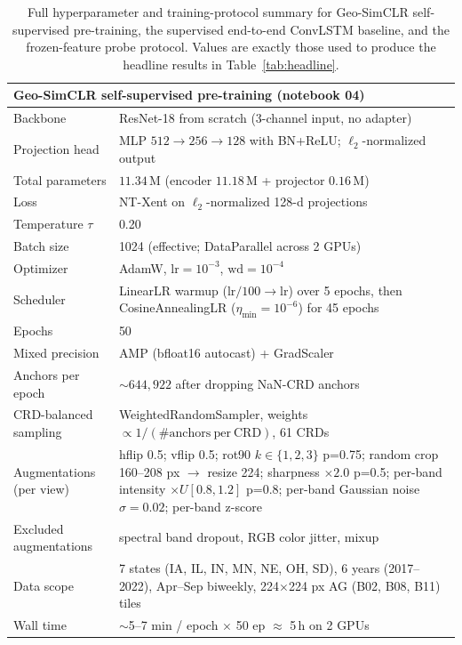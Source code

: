 \begin{table}[H]
\centering
\caption{Full hyperparameter and training-protocol summary for Geo-SimCLR self-supervised pre-training,
the supervised end-to-end ConvLSTM baseline, and the frozen-feature probe protocol. Values are exactly
those used to produce the headline results in Table~\ref{tab:headline}.}
\label{tab:hyperparameters}
\small
\begin{tabular}{p{5.5cm}p{8.5cm}}
\toprule
\multicolumn{2}{l}{\textbf{Geo-SimCLR self-supervised pre-training (notebook 04)}} \\
\midrule
Backbone & ResNet-18 from scratch (3-channel input, no adapter) \\
Projection head & MLP $512 \to 256 \to 128$ with BN+ReLU; $\ell_2$-normalized output \\
Total parameters & $11.34\,\mathrm{M}$ (encoder $11.18\,\mathrm{M}$ + projector $0.16\,\mathrm{M}$) \\
Loss & NT-Xent on $\ell_2$-normalized 128-d projections \\
Temperature $\tau$ & 0.20 \\
Batch size & 1024 (effective; DataParallel across 2 GPUs) \\
Optimizer & AdamW, $\mathrm{lr}=10^{-3}$, $\mathrm{wd}=10^{-4}$ \\
Scheduler & LinearLR warmup ($\mathrm{lr}/100 \to \mathrm{lr}$) over 5 epochs, then CosineAnnealingLR ($\eta_\mathrm{min}=10^{-6}$) for 45 epochs \\
Epochs & 50 \\
Mixed precision & AMP (bfloat16 autocast) + GradScaler \\
Anchors per epoch & $\sim 644{,}922$ after dropping NaN-CRD anchors \\
CRD-balanced sampling & WeightedRandomSampler, weights $\propto 1/(\#\mathrm{anchors\ per\ CRD})$, 61 CRDs \\
Augmentations (per view) & hflip 0.5; vflip 0.5; rot90 $k\!\in\!\{1,2,3\}$ p=0.75; random crop 160--208 px $\to$ resize 224; sharpness $\times 2.0$ p=0.5; per-band intensity $\times U[0.8,1.2]$ p=0.8; per-band Gaussian noise $\sigma=0.02$; per-band z-score \\
Excluded augmentations & spectral band dropout, RGB color jitter, mixup \\
Data scope & 7 states (IA, IL, IN, MN, NE, OH, SD), 6 years (2017--2022), Apr--Sep biweekly, 224$\times$224 px AG (B02, B08, B11) tiles \\
Wall time & $\sim$5--7 min / epoch $\times$ 50 ep $\approx$ 5\,h on 2 GPUs \\

\end{tabular}
\end{table}
